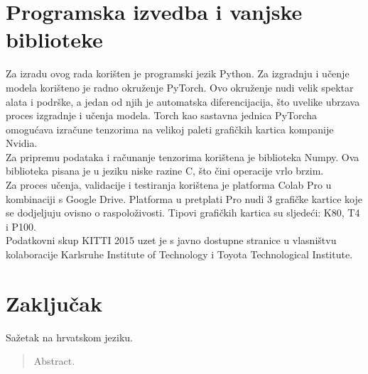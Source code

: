 \documentclass[times, utf8, zavrsni, numeric]{fer}
\begin{document}
\chapter{Programska izvedba i vanjske biblioteke}
Za izradu ovog rada korišten je programski jezik Python. Za izgradnju  i učenje modela korišteno je radno okruženje PyTorch. Ovo okruženje nudi velik spektar alata i podrške, a jedan od njih je automatska diferencijacija, što uvelike ubrzava proces izgradnje i učenja modela. Torch kao sastavna jednica PyTorcha omogućava izračune tenzorima na velikoj paleti grafičkih kartica kompanije Nvidia.\\ Za pripremu podataka i računanje tenzorima korištena je biblioteka Numpy. Ova biblioteka pisana je u jeziku niske razine C, što čini operacije vrlo brzim.\\
Za proces učenja, validacije i testiranja korištena je platforma Colab Pro u kombinaciji s Google Drive. Platforma u pretplati Pro nudi 3 grafičke kartice koje se dodjeljuju ovisno o raspoloživosti. Tipovi grafičkih kartica su sljedeći: K80, T4 i P100.\\
Podatkovni skup KITTI 2015 uzet je s javno dostupne stranice u vlasništvu kolaboracije Karlsruhe Institute of Technology i Toyota Technological Institute. 
\chapter{Zaključak}





\begin{sazetak}
Sažetak na hrvatskom jeziku.

\end{sazetak}

\begin{abstract}
Abstract.

\end{abstract}
\end{document}
